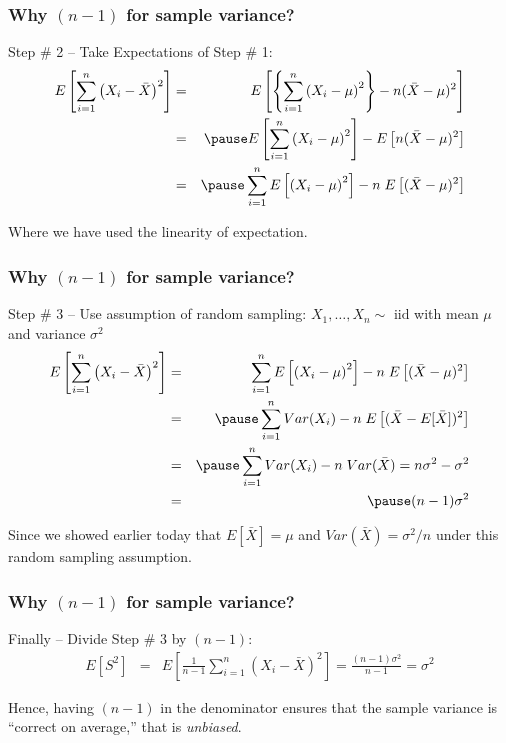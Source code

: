 \documentclass[handout]{beamer}
\begin{document}

\begin{frame}
\frametitle{Why $(n-1)$ for sample variance?}
\begin{block}{Step \# 2 -- Take Expectations of Step \# 1:}
	\begin{eqnarray*}
		E\left[\sum_{i=1}^n \left(X_i - \bar{X}\right)^2\right] &=& E\left[\left\{  \sum_{i=1}^n \left(X_i - \mu\right)^2\right\} - n(\bar{X}-\mu)^2\right]\\
			&=&\pause E\left[ \sum_{i=1}^n \left(X_i - \mu\right)^2\right] -E\left[ n(\bar{X}-\mu)^2\right]\\
			&=&\pause  \sum_{i=1}^n E\left[\left(X_i - \mu\right)^2\right] -n\;E\left[ (\bar{X}-\mu)^2\right]\\
	\end{eqnarray*}
\end{block}
\alert{Where we have used the linearity of expectation.}
\end{frame}


\begin{frame}
\frametitle{Why $(n-1)$ for sample variance?}
\begin{block}{Step \# 3 -- Use assumption of random sampling:}
\alert{$X_1, \hdots, X_n \sim \mbox{ iid}$ with mean $\mu$ and variance $\sigma^2$}
	\begin{eqnarray*}
		E\left[\sum_{i=1}^n \left(X_i - \bar{X}\right)^2\right] &=&  \sum_{i=1}^n E\left[\left(X_i - \mu\right)^2\right] -n\;E\left[ (\bar{X}-\mu)^2\right]\\
		&=&  \pause \sum_{i=1}^n Var(X_i) -n\;E\left[ (\bar{X}-E[\bar{X}])^2\right]\\
		&=& \pause   \sum_{i=1}^n Var(X_i) -n\;Var(\bar{X})= n\sigma^2 - \sigma^2\\
		&=& \pause (n-1)\sigma^2
	\end{eqnarray*}
\end{block}
\alert{Since we showed earlier today that  $E[\bar{X}]=\mu$ and $Var(\bar{X})=\sigma^2/n$ under this random sampling assumption.}
\end{frame}

\begin{frame}
\frametitle{Why $(n-1)$ for sample variance?}
\begin{block}{Finally -- Divide Step \# 3 by $(n-1)$:}
	\begin{eqnarray*}
		E[S^2] &=& E\left[\frac{1}{n-1}\sum_{i=1}^n \left(X_i - \bar{X}\right)^2\right]= \frac{(n-1)\sigma^2}{n-1} = \sigma^2
	\end{eqnarray*}
\end{block}
\alert{Hence, having $(n-1)$ in the denominator ensures that the sample variance is ``correct on average,'' that is \emph{unbiased}.}
\end{frame}
\end{document}
